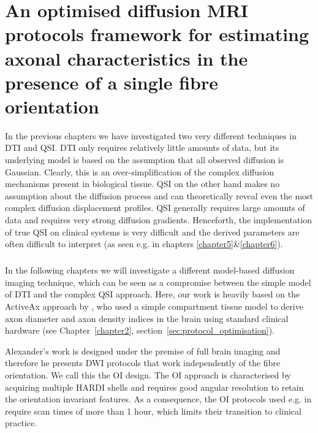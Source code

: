 \chapter{An optimised diffusion MRI protocols framework for estimating axonal characteristics in the presence of a single fibre orientation}
\label{chapter7}
\glsresetall %
In the previous chapters we have investigated two very different techniques in \gls{DTI} and \gls{QSI}. \gls{DTI} only requires relatively little amounts of data, but its underlying model is based on the assumption that all observed diffusion is Gaussian. Clearly, this is an over-simplification of the complex diffusion mechanisms present in biological tissue. \gls{QSI} on the other hand makes no assumption about the diffusion process and can theoretically reveal even the most complex diffusion displacement profiles. \gls{QSI} generally requires large amounts of data and requires very strong diffusion gradients. Henceforth, the implementation of true \gls{QSI} on clinical systems is very difficult and the derived parameters are often difficult to interpret (as seen e.g. in chapters \ref{chapter5}\&\ref{chapter6}).
\paragraph{}
In the following chapters we will investigate a different model-based diffusion imaging technique, which can be seen as a compromise between the simple model of \gls{DTI} and the complex \gls{QSI} approach. Here, our work is heavily based on the ActiveAx approach by \citet{Alexander:2008}, who used a simple compartment tissue model to derive axon diameter and axon density indices in the brain using standard clinical hardware (see Chapter~\ref{chapter2}, section~\ref{sec:protocol_optimisation}).


Alexander's work is designed under the premise of full brain imaging and therefore he presents DWI protocols that work independently of the fibre orientation. We call this the \gls{OI} design. The \gls{OI} approach is characterised by acquiring multiple \gls{HARDI} shells and requires good angular resolution to retain the orientation invariant features. As a consequence, the {\gls{OI}} protocols used e.g. in \citep{Alexander:2010} require scan times of more than 1 hour, which limits their transition to clinical practice.


